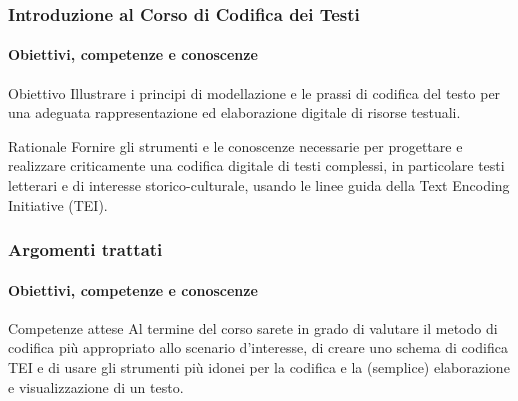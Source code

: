 
\begin{frame}
    \frametitle{Introduzione al Corso di Codifica dei Testi}
    \framesubtitle{Obiettivi, competenze e conoscenze}
    \addtocounter{nframe}{1}
    
    \begin{block}{Obiettivo}
        Illustrare i principi di modellazione e le prassi di codifica del testo per una adeguata rappresentazione ed elaborazione digitale di risorse testuali.  
    \end{block}

    \begin{block}{Rationale}
       Fornire gli strumenti e le conoscenze necessarie per progettare e realizzare criticamente una codifica digitale di testi complessi, in particolare testi letterari e di interesse storico-culturale, usando le linee guida della Text Encoding Initiative (TEI).
    \end{block}

\end{frame}

\begin{frame}
    \frametitle{Argomenti trattati}
    \framesubtitle{Obiettivi, competenze e conoscenze}
    \addtocounter{nframe}{1}
    
    \begin{block}{Competenze attese}
        Al termine del corso sarete in grado di valutare il metodo di codifica più appropriato allo scenario d'interesse, di creare uno schema di codifica TEI e di usare gli strumenti più idonei per la codifica e la (semplice) elaborazione e visualizzazione di un testo.
    \end{block}

    

\end{frame}

